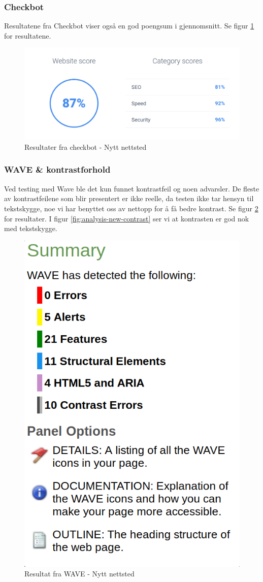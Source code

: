\subsubsection{Checkbot}
Resultatene fra Checkbot viser også en god poengsum i gjennomsnitt. Se figur \ref{fig:analysis-new-checkbot-summary} for resultatene.

\begin{figure}[H]
    \centering
    \includegraphics[width=\textwidth]{bjornar/checkbotio-summary-new.png}
    \caption{Resultater fra checkbot - Nytt nettsted}
    \label{fig:analysis-new-checkbot-summary}
\end{figure}

\subsubsection{WAVE \& kontrastforhold}
Ved testing med Wave ble det kun funnet kontrastfeil og noen advarsler. De fleste av kontrastfeilene som blir presentert er ikke reelle, da testen ikke tar hensyn til tekstskygge, noe vi har benyttet oss av nettopp for å få bedre kontrast. Se figur \ref{fig:analysis-new-wave-summary} for resultater. I figur \ref{fig:analysis-new-contrast} ser vi at kontrasten er god nok med tekstskygge.

\begin{figure}[H]
    \centering
    \includegraphics[width=.3\textwidth]{bjornar/wave-new.png}
    \caption{Resultat fra WAVE - Nytt nettsted}
    \label{fig:analysis-new-wave-summary}
\end{figure}

